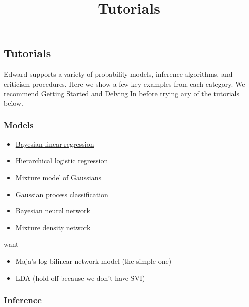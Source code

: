 \title{Tutorials}

\subsection{Tutorials}

Edward supports a variety of probability models, inference
algorithms, and criticism procedures. Here we show a few key examples from each
category. We recommend \href{getting-started.html}{Getting Started} and 
\href{delving-in.html}{Delving In} before trying any of the tutorials below.

\subsubsection{Models}

\begin{itemize}
\item
  \href{https://github.com/blei-lab/edward/blob/master/examples/bayesian_linear_regression.py}{Bayesian
  linear regression}
\item
  \href{https://github.com/blei-lab/edward/blob/master/examples/hierarchical_logistic_regression.py}{Hierarchical
  logistic regression}
\item
  \href{https://github.com/blei-lab/edward/blob/master/examples/mixture_gaussian.py}{Mixture
  model of Gaussians}
\item
  \href{https://github.com/blei-lab/edward/blob/master/examples/gp_classification.py}{Gaussian
  process classification}
\item
  \href{https://github.com/blei-lab/edward/blob/master/examples/bayesian_nn.py}{Bayesian
  neural network}
\item
  \href{https://github.com/blei-lab/edward/blob/master/examples/mixture_density_network.py}{Mixture
  density network}
\end{itemize}

want

\begin{itemize}
  \item Maja's log bilinear network model (the simple one)
  \item LDA (hold off because we don't have SVI)
\end{itemize}

\subsubsection{Inference}

